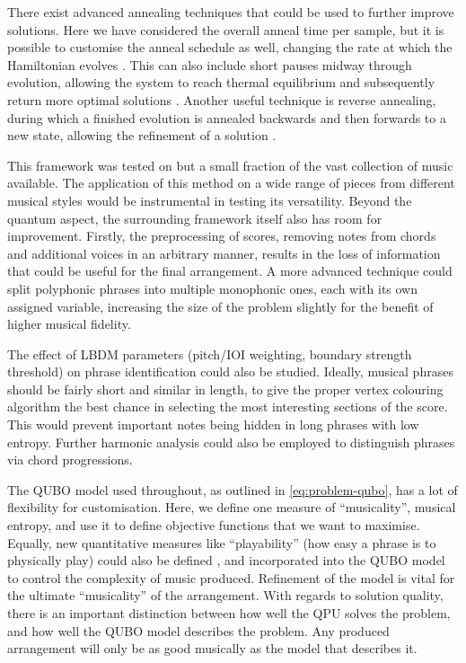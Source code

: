 \documentclass[12pt]{article}
\theoremstyle{definition}
\begin{document}
There exist advanced annealing techniques that could be used to further improve solutions. Here we have considered the overall anneal time per sample, but it is possible to customise the anneal schedule as well, changing the rate at which the Hamiltonian evolves \cite{khezri_customized_2022}. This can also include short pauses midway through evolution, allowing the system to reach thermal equilibrium and subsequently return more optimal solutions \cite{izquierdo_advantage_2022}. Another useful technique is reverse annealing, during which a finished evolution is annealed backwards and then forwards to a new state, allowing the refinement of a solution \cite{dwave_reverse}.

This framework was tested on but a small fraction of the vast collection of music available. The application of this method on a wide range of pieces from different musical styles would be instrumental in testing its versatility. Beyond the quantum aspect, the surrounding framework itself also has room for improvement. Firstly, the preprocessing of scores, removing notes from chords and additional voices in an arbitrary manner, results in the loss of information that could be useful for the final arrangement. A more advanced technique could split polyphonic phrases into multiple monophonic ones, each with its own assigned variable, increasing the size of the problem slightly for the benefit of higher musical fidelity.

The effect of LBDM parameters (pitch/IOI weighting, boundary strength threshold) on phrase identification could also be studied. Ideally, musical phrases should be fairly short and similar in length, to give the proper vertex colouring algorithm the best chance in selecting the most interesting sections of the score. This would prevent important notes being hidden in long phrases with low entropy. Further harmonic analysis could also be employed to distinguish phrases via chord progressions.

The QUBO model used throughout, as outlined in \cref{eq:problem-qubo}, has a lot of flexibility for customisation. Here, we define one measure of ``musicality'', musical entropy, and use it to define objective functions that we want to maximise. Equally, new quantitative measures like ``playability'' (how easy a phrase is to physically play) could also be defined \cite{nakamura_statistical_2018}, and incorporated into the QUBO model to control the complexity of music produced. Refinement of the model is vital for the ultimate ``musicality'' of the arrangement. With regards to solution quality, there is an important distinction between how well the QPU solves the problem, and how well the QUBO model describes the problem. Any produced arrangement will only be as good musically as the model that describes it.
\end{document}
